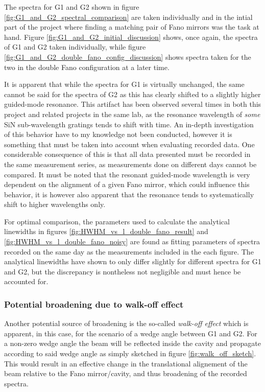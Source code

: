 The spectra for G1 and G2 shown in figure \ref{fig:G1_and_G2_spectral_comparison} are taken individually and in the intial part of the project where finding a matching pair of Fano mirrors was the task at hand. Figure \ref{fig:G1_and_G2_initial_discussion} shows, once again, the spectra of G1 and G2 taken individually, while figure \ref{fig:G1_and_G2_double_fano_config_discussion} shows spectra taken for the two in the double Fano configuration at a later time.

It is apparent that while the spectra for G1 is virtually unchanged, the same cannot be said for the spectra of G2 as this has clearly shifted to a slightly higher guided-mode resonance. This artifact has been observed several times in both this project and related projects in the same lab, as the resonance wavelength of \emph{some} SiN sub-wavelength gratings tends to shift with time. An in-depth investigation of this behavior have to my knowledge not been conducted, however it is something that must be taken into account when evaluating recorded data. One considerable consequence of this is that all data presented must be recorded in the same measurement series, as measurements done on different days cannot be compared. It must be noted that the resonant guided-mode wavelength is very dependent on the alignment of a given Fano mirror, which could influence this behavior, it is however also apparent that the resonance tends to systematically shift to higher wavelengths only. 

For optimal comparison, the parameters used to calculate the analytical linewidths in figures \ref{fig:HWHM_vs_l_double_fano_result} and \ref{fig:HWHM_vs_l_double_fano_noisy} are found as fitting parameters of spectra recorded on the same day as the measurements included in the each figure. The analytical linewidths have shown to only differ slightly for different spectra for G1 and G2, but the discrepancy is nontheless not negligible and must hence be accounted for.

\subsubsection{Potential broadening due to walk-off effect}

Another potential source of broadening is the so-called \emph{walk-off effect} which is apparent, in this case, for the scenario of a wedge angle between G1 and G2. For a non-zero wedge angle the beam will be reflected inside the cavity and propagate according to said wedge angle as simply sketched in figure \ref{fig:walk_off_sketch}. This would result in an effective change in the translational alignement of the beam relative to the Fano mirror/cavity, and thus broadening of the recorded spectra.

